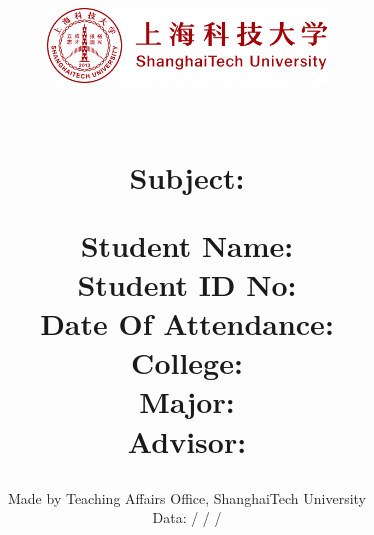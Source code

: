\documentclass{report}
\title{
	\raggedright {\includegraphics[width=10em]{ShanghaiTech_Logo.png}\\}
	\centering
    \vspace{2in}
    \textmd{\textbf{\thesisClass}}\\
    \normalsize\vspace{0.1in}
    \vspace{0.1in}
    \Large
    {
   		Subject: \subject\\
   		Student Name: \studentName\\
   		Student ID No: \studentID\\
   		Date Of Attendance: \dateOfAttendence\\
   		College: \college\\
   		Major: \major\\
   		Advisor: \advisor\\ 
    }
    \vspace{2.7in}
}
\author{\tiny Made by Teaching Affairs Office, ShanghaiTech University\\
		\tiny Data: / / /}
\date{}
\newenvironment*{Abstract}[1][-1]{
	 {\centering \LARGE \textbf{Abstract}\\}}
\begin{document}
\maketitle
\pagebreak


\tableofcontents
\pagebreak

\begin{Abstract}
	Content..
\end{Abstract}

\chapter{This is Chapter One}
\chapter{This is Chapter Two}
\section{Section ONe}
\subsection{Sub1}
\end{document}
